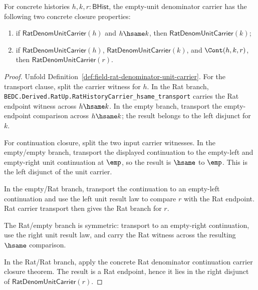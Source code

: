 \begin{theorem}
\label{thm:rat-denom-unit-carrier-transport-closure-package}
For concrete histories $h,k,r:\mathsf{BHist}$, the empty-unit denominator
carrier has the following two concrete closure properties:
\begin{enumerate}
\item if $\mathsf{RatDenomUnitCarrier}(h)$ and $h\hsame k$, then
$\mathsf{RatDenomUnitCarrier}(k)$;
\item if $\mathsf{RatDenomUnitCarrier}(h)$,
$\mathsf{RatDenomUnitCarrier}(k)$, and $\Cont(h,k,r)$, then
$\mathsf{RatDenomUnitCarrier}(r)$.
\end{enumerate}
\end{theorem}
\begin{proof}
Unfold Definition~\ref{def:field-rat-denominator-unit-carrier}. For the
transport clause, split the carrier witness for $h$. In the Rat branch,
\texttt{BEDC.Derived.RatUp.RatHistoryCarrier\_hsame\_transport} carries the
Rat endpoint witness across $h\hsame k$. In the empty branch, transport the
empty-endpoint comparison across $h\hsame k$; the result belongs to the left
disjunct for $k$.

For continuation closure, split the two input carrier witnesses. In the
empty/empty branch, transport the displayed continuation to the empty-left and
empty-right unit continuation at $\emp$, so the result is $\hsame$ to $\emp$.
This is the left disjunct of the unit carrier.

In the empty/Rat branch, transport the continuation to an empty-left
continuation and use the left unit result law to compare $r$ with the Rat
endpoint. Rat carrier transport then gives the Rat branch for $r$.

The Rat/empty branch is symmetric: transport to an empty-right continuation,
use the right unit result law, and carry the Rat witness across the resulting
$\hsame$ comparison.

In the Rat/Rat branch, apply the concrete Rat denominator continuation carrier
closure theorem. The result is a Rat endpoint, hence it lies in the right
disjunct of $\mathsf{RatDenomUnitCarrier}(r)$.
\end{proof}
